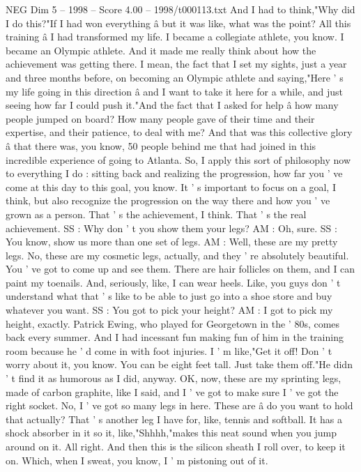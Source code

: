\begin{textsample}{NEG Dim 5 – 1998 – Score 4.00 – 1998/t000113.txt}
And I had to think,"Why did I do this?"If I had won everything â but it was like, what was the point?
All this training â I had transformed my life.
I became a collegiate athlete, you know.
I became an Olympic athlete.
And it made me really think about how the achievement was getting there.
I mean, the fact that I set my sights, just a year and three months before, on becoming an Olympic athlete and saying,"Here ' s my life going in this direction â and I want to take it here for a while, and just seeing how far I could push it."And the fact that I asked for help â how many people jumped on board?
How many people gave of their time and their expertise, and their patience, to deal with me?
And that was this collective glory â that there was, you know, 50 people behind me that had joined in this incredible experience of going to Atlanta.
So, I apply this sort of philosophy now to everything I do : sitting back and realizing the progression, how far you ' ve come at this day to this goal, you know.
It ' s important to focus on a goal, I think, but also recognize the progression on the way there and how you ' ve grown as a person.
That ' s the achievement, I think.
That ' s the real achievement.
SS : Why don ' t you show them your legs?
AM : Oh, sure.
SS : You know, show us more than one set of legs.
AM : Well, these are my pretty legs.
No, these are my cosmetic legs, actually, and they ' re absolutely beautiful.
You ' ve got to come up and see them.
There are hair follicles on them, and I can paint my toenails.
And, seriously, like, I can wear heels.
Like, you guys don ' t understand what that ' s like to be able to just go into a shoe store and buy whatever you want.
SS : You got to pick your height?
AM : I got to pick my height, exactly.
Patrick Ewing, who played for Georgetown in the ' 80s, comes back every summer.
And I had incessant fun making fun of him in the training room because he ' d come in with foot injuries.
I ' m like,"Get it off!
Don ' t worry about it, you know.
You can be eight feet tall.
Just take them off."He didn ' t find it as humorous as I did, anyway.
OK, now, these are my sprinting legs, made of carbon graphite, like I said, and I ' ve got to make sure I ' ve got the right socket.
No, I ' ve got so many legs in here.
These are â do you want to hold that actually?
That ' s another leg I have for, like, tennis and softball.
It has a shock absorber in it so it, like,"Shhhh,"makes this neat sound when you jump around on it.
All right.
And then this is the silicon sheath I roll over, to keep it on.
Which, when I sweat, you know, I ' m pistoning out of it.

\end{textsample}
